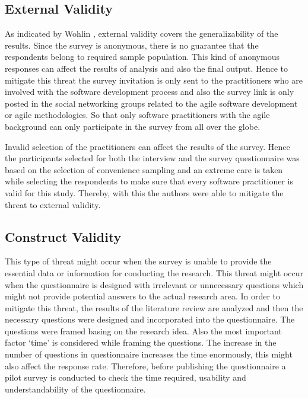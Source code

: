 \documentclass[a4paper,oneside]{bth}
\begin{document}
\subsection{External Validity}
As indicated by Wohlin \cite{wohlin_experimentation_2012}, external validity covers the generalizability of the results. Since the survey is anonymous, there is no guarantee that the respondents belong to required sample population. This kind of anonymous responses can affect the results of analysis and also the final output. Hence to mitigate this threat the survey
invitation is only sent to the practitioners who are involved with the software development process and also the survey link is only posted in the social networking groups related to the agile software development or agile methodologies. So that only software practitioners with the agile background can only participate in the survey from all over the globe.

Invalid selection of the practitioners can affect the results of the survey. Hence the participants selected for both the interview and the survey questionnaire was based on the selection of convenience sampling and an extreme care is taken while selecting the respondents to make sure that every software practitioner is valid for this study. Thereby, with this the authors were able to mitigate the threat to external validity.
\subsection{Construct Validity}
This type of threat might occur when the survey is unable to provide the essential data or information for conducting the research. This threat might occur when the questionnaire is designed with irrelevant or unnecessary questions which might not provide potential answers to the actual research area. In order to mitigate this threat, the results of the literature review are analyzed and then the necessary questions were designed and incorporated into the questionnaire. The questions were framed basing on the research idea. Also the most important factor ‘time’ is considered while framing the questions. The increase in the number of questions in questionnaire increases the time enormously, this might also affect the response rate. Therefore, before publishing the questionnaire a pilot survey is conducted to check the time required, usability and understandability of the questionnaire.
\end{document}
